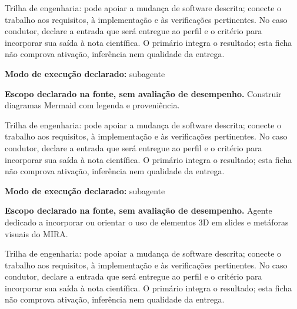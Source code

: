 \begin{funcao}
Trilha de engenharia: pode apoiar a mudança de software descrita; conecte o trabalho aos requisitos, à implementação e às verificações pertinentes. No caso condutor, declare a entrada que será entregue ao perfil e o critério para incorporar sua saída à nota científica. O primário integra o resultado; esta ficha não comprova ativação, inferência nem qualidade da entrega.
\end{funcao}

\begin{arquitetura}
\textbf{Modo de execução declarado:} subagente
\end{arquitetura}


\begin{descricao}
\textbf{Escopo declarado na fonte, sem avaliação de desempenho.}
Construir diagramas Mermaid com legenda e proveniência.
\end{descricao}

\begin{funcao}
Trilha de engenharia: pode apoiar a mudança de software descrita; conecte o trabalho aos requisitos, à implementação e às verificações pertinentes. No caso condutor, declare a entrada que será entregue ao perfil e o critério para incorporar sua saída à nota científica. O primário integra o resultado; esta ficha não comprova ativação, inferência nem qualidade da entrega.
\end{funcao}

\begin{arquitetura}
\textbf{Modo de execução declarado:} subagente
\end{arquitetura}


\begin{descricao}
\textbf{Escopo declarado na fonte, sem avaliação de desempenho.}
Agente dedicado a incorporar ou orientar o uso de elementos 3D em slides e metáforas visuais do MIRA.
\end{descricao}

\begin{funcao}
Trilha de engenharia: pode apoiar a mudança de software descrita; conecte o trabalho aos requisitos, à implementação e às verificações pertinentes. No caso condutor, declare a entrada que será entregue ao perfil e o critério para incorporar sua saída à nota científica. O primário integra o resultado; esta ficha não comprova ativação, inferência nem qualidade da entrega.
\end{funcao}

